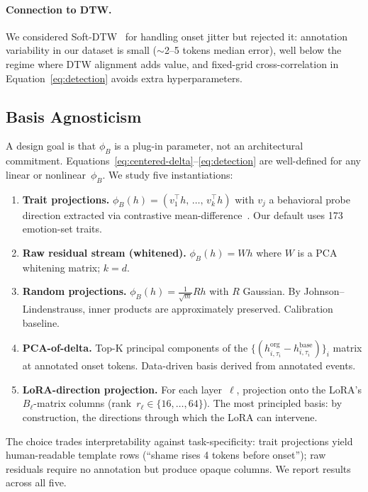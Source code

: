 \paragraph{Connection to DTW.}
We considered Soft-DTW~\citep{cuturi2017softdtw} for handling onset jitter
but rejected it: annotation variability in our dataset is small ($\sim$2--5
tokens median error), well below the regime where DTW alignment adds value,
and fixed-grid cross-correlation in Equation~\eqref{eq:detection} avoids
extra hyperparameters.

\subsection{Basis Agnosticism}
\label{sec:basis}

A design goal is that $\phi_B$ is a plug-in parameter, not an architectural
commitment. Equations~\eqref{eq:centered-delta}--\eqref{eq:detection} are
well-defined for any linear or nonlinear~$\phi_B$. We study five
instantiations:
\begin{enumerate}
  \item \textbf{Trait projections.}
    $\phi_B(h) = (v_1^\top h,\,\ldots,\,v_k^\top h)$ with $v_j$ a behavioral
    probe direction extracted via contrastive
    mean-difference~\citep{panickssery2024caa}. Our default uses 173
    emotion-set traits.
  \item \textbf{Raw residual stream (whitened).} $\phi_B(h) = W h$ where $W$ is
    a PCA whitening matrix; $k=d$.
  \item \textbf{Random projections.} $\phi_B(h) = \frac{1}{\sqrt{m}} R h$ with
    $R$ Gaussian. By Johnson--Lindenstrauss, inner products are approximately
    preserved. Calibration baseline.
  \item \textbf{PCA-of-delta.} Top-K principal components of the
    $\{(h^{\mathrm{org}}_{i,\tau_i} - h^{\mathrm{base}}_{i,\tau_i})\}_i$
    matrix at annotated onset tokens. Data-driven basis derived from
    annotated events.
  \item \textbf{LoRA-direction projection.} For each layer~$\ell$, projection
    onto the LoRA's $B_\ell$-matrix columns
    (rank~$r_\ell \in \{16, \ldots, 64\}$). The most principled basis: by
    construction, the directions through which the LoRA can intervene.
\end{enumerate}
The choice trades interpretability against task-specificity: trait
projections yield human-readable template rows
(``\textsf{shame} rises 4 tokens before onset''); raw residuals require no
annotation but produce opaque columns. We report results across all five.


